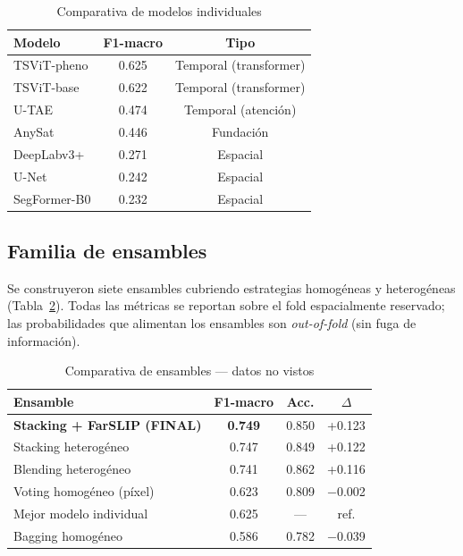 \documentclass{article}
\begin{document}
\begin{table}[htbp]
\caption{Comparativa de modelos individuales}
\label{tab:individual_models}
\centering
\begin{tabular}{lcc}
\toprule
\textbf{Modelo} & \textbf{F1-macro} & \textbf{Tipo} \\
\midrule
TSViT-pheno     & 0.625 & Temporal (transformer) \\
TSViT-base      & 0.622 & Temporal (transformer) \\
U-TAE           & 0.474 & Temporal (atención) \\
AnySat          & 0.446 & Fundación \\
DeepLabv3+      & 0.271 & Espacial \\
U-Net           & 0.242 & Espacial \\
SegFormer-B0    & 0.232 & Espacial \\
\bottomrule
\end{tabular}
\end{table}

\subsection{Familia de ensambles}

Se construyeron siete ensambles cubriendo estrategias homogéneas y
heterogéneas (Tabla~\ref{tab:ensembles}). Todas las métricas se reportan
sobre el fold espacialmente reservado; las probabilidades que alimentan
los ensambles son \textit{out-of-fold} (sin fuga de información).

\begin{table}[htbp]
\caption{Comparativa de ensambles --- datos no vistos}
\label{tab:ensembles}
\centering
\begin{tabular}{lccc}
\toprule
\textbf{Ensamble} & \textbf{F1-macro} & \textbf{Acc.} & \textbf{$\Delta$} \\
\midrule
\textbf{Stacking + FarSLIP (FINAL)} & \textbf{0.749} & 0.850 & +0.123 \\
Stacking heterogéneo        & 0.747 & 0.849 & +0.122 \\
Blending heterogéneo        & 0.741 & 0.862 & +0.116 \\
Voting homogéneo (píxel)    & 0.623 & 0.809 & $-$0.002 \\
Mejor modelo individual     & 0.625 & ---   & ref. \\
Bagging homogéneo           & 0.586 & 0.782 & $-$0.039 \\
\bottomrule
\end{tabular}
\end{table}
\end{document}

